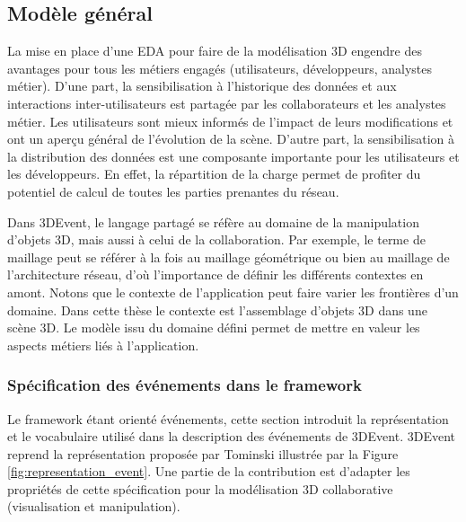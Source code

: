 \subsection{Modèle général}


La mise en place d'une \gls{EDA} pour faire de la modélisation \gls{3D} engendre 
des avantages pour tous les métiers engagés (utilisateurs, développeurs, 
analystes métier).
D'une part, la sensibilisation à l'historique des données et aux interactions 
inter-utilisateurs est partagée par les collaborateurs et les analystes métier. 
Les utilisateurs sont mieux informés de l'impact de leurs modifications et 
ont un aperçu général de l'évolution de la scène. D'autre part, 
la sensibilisation à la distribution des données est une composante 
importante pour les utilisateurs et les développeurs. En effet, la répartition 
de la charge permet de profiter du potentiel de calcul de toutes les parties 
prenantes du réseau. 

Dans 3DEvent, le langage partagé se réfère au domaine de la manipulation 
d'objets \gls{3D}, mais aussi à celui de la collaboration. Par exemple, le terme 
de maillage peut se référer à la fois au maillage géométrique ou bien au maillage 
de l'architecture réseau, d'où l'importance de définir les différents contextes en 
amont. 
Notons que le contexte de l'application peut faire varier les frontières d'un 
domaine. Dans cette thèse le contexte est l'assemblage d'objets 3D dans une 
scène 3D. Le modèle issu du domaine défini permet de mettre en valeur les 
aspects métiers liés à l'application.

\subsubsection{Spécification des événements dans le framework}
Le \gls{framework} étant orienté événements, cette section introduit la 
représentation et le vocabulaire utilisé dans la description des événements de 
3DEvent. 3DEvent reprend la représentation proposée par Tominski 
\cite{Doktor-ingenieur2006} illustrée par la Figure \ref{fig:representation_event}. 
Une partie de la contribution est d'adapter les propriétés de cette spécification pour 
la modélisation \gls{3D} collaborative (visualisation et manipulation). 

